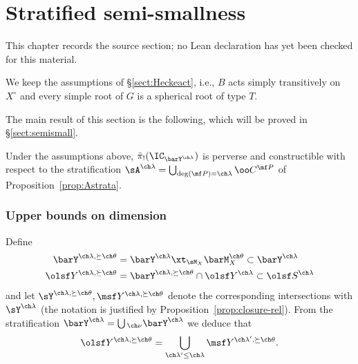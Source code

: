 \chapter{Stratified semi-smallness}
\label{intersection-complexes-unramified-l-factors-chapter-06}

\begin{remark}
\label{intersection-complexes-unramified-l-factors-chapter-06-source}
This chapter records the source section; no Lean declaration has yet been checked for this material.
\notready
\end{remark}

\label{sect:centralfiber}


We keep the assumptions of \S\ref{sect:Heckeact}, i.e.,
$B$ acts simply transitively on $X^\circ$ and every simple root of $G$ is
a spherical root of type $T$.





The main result of this section is the following, which
will be proved in \S\ref{sect:semismall}.

\begin{thm}
\notready  \label{thm:barpiperverse}
Under the assumptions above,
$\bar\pi_!(\IC_{\barY^{\ch\lambda}})$ is perverse
and constructible with respect to the stratification
$\sA^{\ch\lambda} = \bigcup_{\deg(\mf P)=\ch\lambda} \oo C^{\mf P}$
of Proposition~\ref{prop:Astrata}.
\end{thm}




\subsection{Upper bounds on dimension}

Define
\begin{align*}
    \barY^{\ch\lambda,\succeq \ch\theta} &= \barY^{\ch\lambda} \xt_{\sM_X} \barM_X^{\ch\theta} \subset \barY^{\ch\lambda} \\
    \olsf Y^{\ch\lambda, \succeq \ch\theta} &= \barY^{\ch\lambda, \succeq\ch\theta} \cap \olsf Y^{\ch\lambda} \subset \olsf S^{\ch\lambda}
\end{align*}
and let $\sY^{\ch\lambda,\succeq \ch\theta}, \msf Y^{\ch\lambda,\succeq \ch\theta}$ denote the corresponding intersections with $\sY^{\ch\lambda}$
(the notation is
justified by Proposition~\ref{prop:closure-rel}).
From the stratification $\barY^{\ch\lambda} = \bigcup {_{\ch\nu}}\barY^{\ch\lambda}$ we deduce that
\[\olsf Y^{\ch\lambda,\succeq\ch\theta} = \bigcup_{\ch\lambda' \le \ch\lambda} \msf Y^{\ch\lambda',\succeq\ch\theta}.\]


